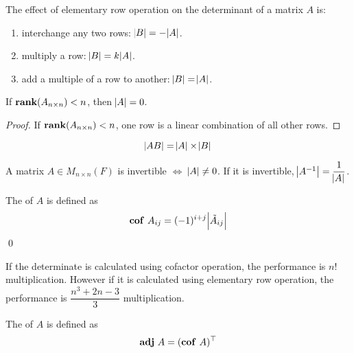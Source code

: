 \begin{theorem}
    The effect of elementary row operation on the determinant of a matrix $A$ is:
\begin{enumerate}
    \item interchange any two rows: $\abs{B} = - \abs{A}$.
    \item multiply a row: $\abs{B} = k \abs{A}$.
    \item add a multiple of a row to another: $\abs{B} = \abs{A}$.
\end{enumerate}
\end{theorem}


\begin{theorem}
    If $\displaystyle \mathbf{rank}( A_{n \times n} ) < n$, then $\abs{A} = 0$.
\end{theorem}
\begin{proof}
    If $\displaystyle \mathbf{rank}( A_{n \times n} ) < n$, one row is a linear combination of all other rows.
\end{proof}



\begin{theorem}
	\begin{equation}
		\abs{AB} = \abs{A} \times \abs{B}
	\end{equation}
\end{theorem}

\begin{theorem}
	A matrix $A \in M_{n \times n}(F)$ is invertible $\Leftrightarrow$ $\abs{A} \neq 0$. If it is invertible, $\abs{A^{-1}} = \dfrac{1}{\abs{A}}$.
\end{theorem}

\begin{definition}
    The  of $A$ is defined as 
    \begin{equation}
        \displaystyle \mathbf{cof} ~\displaystyle A_{ij} = (-1)^{i+j} \abs{\tilde{A}_{ij}}
    \end{equation}\qed
\end{definition}


If the determinate is calculated using cofactor operation, the performance is $n!$ multiplication. However if it is calculated using elementary row operation, the performance is $\dfrac{n^3 + 2n - 3}{3}$ multiplication.

\begin{definition}
    The  of $A$ is defined as
    \begin{equation}
        \displaystyle \mathbf{adj} ~\displaystyle A = (\displaystyle \mathbf{cof} ~\displaystyle A)^\top
    \end{equation}
\end{definition}

